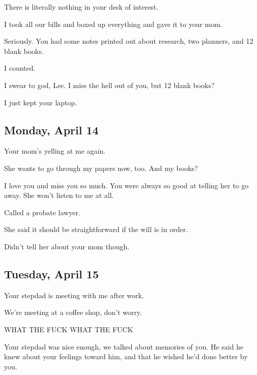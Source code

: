 { There is literally nothing in your desk of interest.

 I took all our bills and boxed up everything and gave it to your mom.

 Seriously. You had some notes printed out about research, two planners, and 12 blank books.

 I counted.

 I swear to god, Lee. I miss the hell out of you, but 12 blank books?

 I just kept your laptop.

\newpage

\subsection*{Monday, April 14}\label{monday-april-14}

 Your mom's yelling at me again.

 She wants to go through my papers now, too. And my books?

 I love you and miss you so much. You were always so good at telling her to go away. She won't listen to me at all.

 Called a probate lawyer.

 She said it should be straightforward if the will is in order.

 Didn't tell her about your mom though.

\newpage

\subsection*{Tuesday, April 15}\label{tuesday-april-15}

 Your stepdad is meeting with me after work.

 We're meeting at a coffee shop, don't worry.

 WHAT THE FUCK WHAT THE FUCK

 Your stepdad was nice enough, we talked about memories of you. He said he knew about your feelings toward him, and that he wished he'd done better by you.

}

